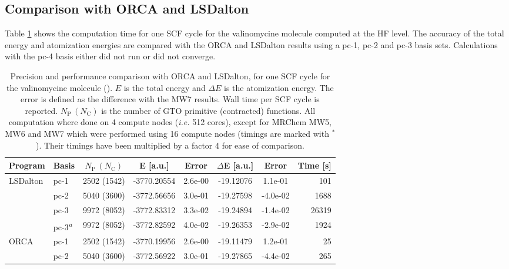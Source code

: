 \documentclass[journal=jctcce, manuscript=article]{achemso}
\begin{document}
\subsection{Comparison with ORCA  and LSDalton  }

Table \ref{tab:MRC_ORCA_LSD} shows the computation time for one
\ac{SCF} cycle for the valinomycine molecule computed at the
\ac{HF} level. The accuracy of the total energy and atomization
energies are compared with the ORCA and LSDalton results using a pc-1,
pc-2 and pc-3 basis sets.\cite{Jensen2001-qo, Jensen2002-pp} Calculations with the pc-4 basis either did not run or did not converge.

\begin{table}[htb]
    \caption{Precision and performance comparison with ORCA and LSDalton, for one \ac{SCF} cycle for the valinomycine molecule (). $E$ is the total energy and $\Delta E$ is the atomization energy. The error is defined as the difference with the MW7 results. Wall time per \ac{SCF} cycle is reported. $N_{\mathrm{P}}\,(N_{\mathrm{C}})$ is the number of GTO primitive (contracted) functions. All computation where done on 4 compute nodes (\emph{i.e.} 512 cores), except for MRChem MW5, MW6 and MW7 which were performed using 16 compute nodes (timings are marked with $^{*}$). Their timings have been multiplied by a factor 4 for ease of comparison.}\label{tab:MRC_ORCA_LSD}
    \begin{tabular}{llcccccr}
    \toprule
    Program & Basis     & $N_{\mathrm{P}}\,(N_{\mathrm{C}})$  & E [a.u.] &Error &$\Delta$E [a.u.]& Error & Time [s]\\
    \midrule
\multirow{4}{*}{LSDalton} & pc-1                           &2502 (1542)&-3770.20554 &2.6e-00 &-19.12076 &1.1e-01   &101     \\
                          & pc-2                           &5040 (3600)&-3772.56656 &3.0e-01 &-19.27598 &-4.0e-02  &1688    \\
                          & pc-3                           &9972 (8052)&-3772.83312 &3.3e-02 &-19.24894 &-1.4e-02  &26319   \\
                          & pc-3\textsuperscript{\emph{a}} &9972 (8052)&-3772.82592 &4.0e-02 &-19.26353 &-2.9e-02  &1924    \\
    \midrule                        
\multirow{3}{*}{ORCA} & pc-1&2502 (1542)&-3770.19956 &2.6e-00 &-19.11479 &1.2e-01   &25      \\
                      & pc-2&5040 (3600)&-3772.56922 &3.0e-01 &-19.27865 &-4.4e-02  &265     \\

\end{tabular}
\end{table}
\end{document}
